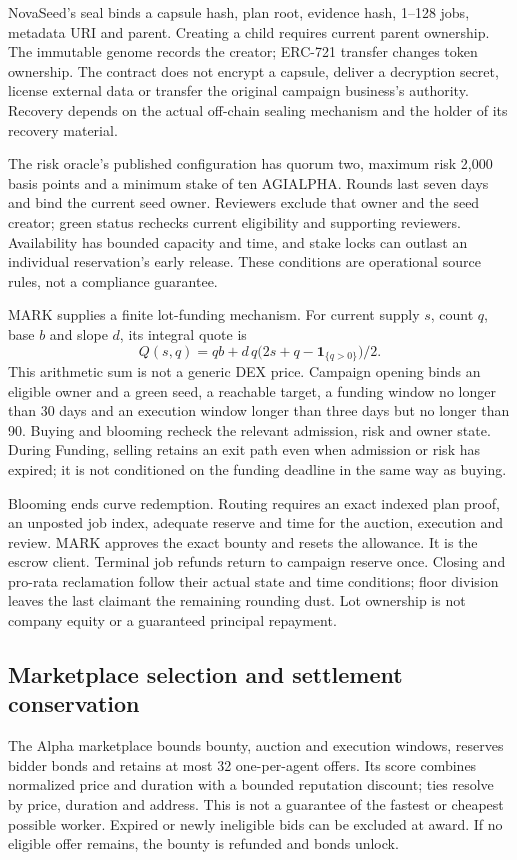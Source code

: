 \documentclass[11pt,letterpaper]{article}
\theoremstyle{definition}\newtheorem{definition}[theorem]{Definition}
\theoremstyle{remark}\newtheorem{remark}[theorem]{Remark}
\begin{document}
NovaSeed's seal binds a capsule hash, plan root, evidence hash, 1--128 jobs, metadata URI and parent. Creating a child requires current parent ownership. The immutable genome records the creator; ERC-721 transfer changes token ownership. The contract does not encrypt a capsule, deliver a decryption secret, license external data or transfer the original campaign business's authority. Recovery depends on the actual off-chain sealing mechanism and the holder of its recovery material.

The risk oracle's published configuration has quorum two, maximum risk 2,000 basis points and a minimum stake of ten AGIALPHA. Rounds last seven days and bind the current seed owner. Reviewers exclude that owner and the seed creator; green status rechecks current eligibility and supporting reviewers. Availability has bounded capacity and time, and stake locks can outlast an individual reservation's early release. These conditions are operational source rules, not a compliance guarantee.

MARK supplies a finite lot-funding mechanism. For current supply \(s\), count \(q\), base \(b\) and slope \(d\), its integral quote is
\begin{equation}
 Q(s,q)=qb+d\,q\bigl(2s+q-\mathbf1_{\{q>0\}}\bigr)/2 .
 \label{eq:mark}
\end{equation}
This arithmetic sum is not a generic DEX price. Campaign opening binds an eligible owner and a green seed, a reachable target, a funding window no longer than 30 days and an execution window longer than three days but no longer than 90. Buying and blooming recheck the relevant admission, risk and owner state. During Funding, selling retains an exit path even when admission or risk has expired; it is not conditioned on the funding deadline in the same way as buying.

Blooming ends curve redemption. Routing requires an exact indexed plan proof, an unposted job index, adequate reserve and time for the auction, execution and review. MARK approves the exact bounty and resets the allowance. It is the escrow client. Terminal job refunds return to campaign reserve once. Closing and pro-rata reclamation follow their actual state and time conditions; floor division leaves the last claimant the remaining rounding dust. Lot ownership is not company equity or a guaranteed principal repayment.

\subsection{Marketplace selection and settlement conservation}
The Alpha marketplace bounds bounty, auction and execution windows, reserves bidder bonds and retains at most 32 one-per-agent offers. Its score combines normalized price and duration with a bounded reputation discount; ties resolve by price, duration and address. This is not a guarantee of the fastest or cheapest possible worker. Expired or newly ineligible bids can be excluded at award. If no eligible offer remains, the bounty is refunded and bonds unlock.
\end{document}
